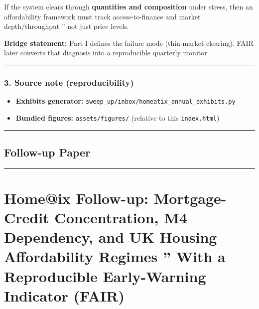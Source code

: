 \documentclass[
]{article}
\providecommand{\tightlist}{%
  \setlength{\itemsep}{0pt}\setlength{\parskip}{0pt}}
\begin{document}
If the system clears through \textbf{quantities and composition} under
stress, then an affordability framework must track access-to-finance and
market depth/throughput '' not just price levels.

\textbf{Bridge statement:} Part I defines the failure mode (thin-market
clearing). FAIR later converts that diagnosis into a reproducible
quarterly monitor.

\begin{center}\rule{0.5\linewidth}{0.5pt}\end{center}

\protect{}\label{part1-source-note}
\subsubsection{3. Source note
(reproducibility)}\label{source-note-reproducibility}

\begin{itemize}
\tightlist
\item
  \textbf{Exhibits generator:}
  \texttt{sweep\_up/inbox/homeatix\_annual\_exhibits.py}
\item
  \textbf{Bundled figures:} \texttt{assets/figures/} (relative to this
  \texttt{index.html})
\end{itemize}

\begin{center}\rule{0.5\linewidth}{0.5pt}\end{center}

\protect{}\label{followup}
\subsection{Follow-up Paper}\label{follow-up-paper}

\begin{center}\rule{0.5\linewidth}{0.5pt}\end{center}

\section{\texorpdfstring{\textbf{Home@ix Follow-up:} Mortgage-Credit
Concentration, M4 Dependency, and UK Housing Affordability Regimes ''
With a Reproducible Early-Warning Indicator
(FAIR)}{Home@ix Follow-up: Mortgage-Credit Concentration, M4 Dependency, and UK Housing Affordability Regimes '' With a Reproducible Early-Warning Indicator (FAIR)}}\label{homeix-follow-up-mortgage-credit-concentration-m4-dependency-and-uk-housing-affordability-regimes-with-a-reproducible-early-warning-indicator-fair}
\end{document}
